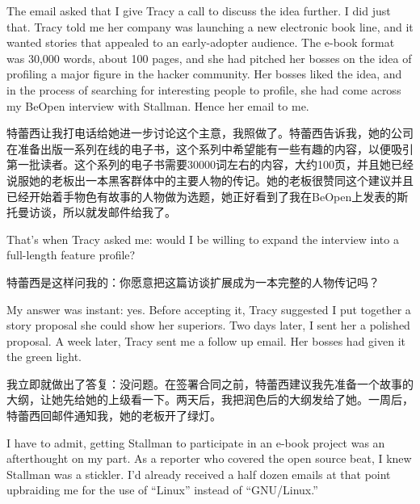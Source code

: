 \ifdefined\eng
The email asked that I give Tracy a call to discuss the idea further. I did just that. Tracy told me her company was launching a new electronic book line, and it wanted stories that appealed to an early-adopter audience. The e-book format was 30,000 words, about 100 pages, and she had pitched her bosses on the idea of profiling a major figure in the hacker community. Her bosses liked the idea, and in the process of searching for interesting people to profile, she had come across my BeOpen interview with Stallman. Hence her email to me.
\fi

\ifdefined\chs
特蕾西让我打电话给她进一步讨论这个主意，我照做了。特蕾西告诉我，她的公司在准备出版一系列在线的电子书，这个系列中希望能有一些有趣的内容，以便吸引第一批读者。这个系列的电子书需要30000词左右的内容，大约100页，并且她已经说服她的老板出一本黑客群体中的主要人物的传记。她的老板很赞同这个建议并且已经开始着手物色有故事的人物做为选题，她正好看到了我在BeOpen上发表的斯托曼访谈，所以就发邮件给我了。
\fi

\ifdefined\eng
That's when Tracy asked me: would I be willing to expand the interview into a full-length feature profile?
\fi

\ifdefined\chs
特蕾西是这样问我的：你愿意把这篇访谈扩展成为一本完整的人物传记吗？
\fi

\ifdefined\eng
My answer was instant: yes. Before accepting it, Tracy suggested I put together a story proposal she could show her superiors. Two days later, I sent her a polished proposal. A week later, Tracy sent me a follow up email. Her bosses had given it the green light.
\fi

\ifdefined\chs
我立即就做出了答复：没问题。在签署合同之前，特蕾西建议我先准备一个故事的大纲，让她先给她的上级看一下。两天后，我把润色后的大纲发给了她。一周后，特蕾西回邮件通知我，她的老板开了绿灯。
\fi

\ifdefined\eng
I have to admit, getting Stallman to participate in an e-book project was an afterthought on my part. As a reporter who covered the open source beat, I knew Stallman was a stickler. I'd already received a half dozen emails at that point upbraiding me for the use of ``Linux'' instead of ``GNU/Linux.''
\fi

